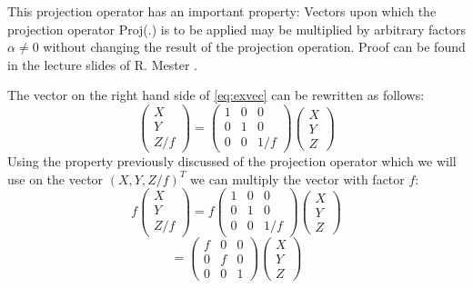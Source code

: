 This projection operator has an important property: Vectors upon which the projection operator Proj(.) is to be applied may be multiplied by arbitrary factors $\alpha\neq 0$ without changing the result of the projection operation. Proof can be found in the lecture slides of R. Mester \cite{computer_vision}.\bigskip

The vector on the right hand side of \autoref{eq:exvec} can be rewritten as follows:
\begin{equation}
    \begin{pmatrix}
        X \\ Y \\ Z/f
    \end{pmatrix} = 
    \begin{pmatrix}
        1 & 0 & 0\\ 
        0 & 1 & 0\\ 
        0 & 0 & 1/f
    \end{pmatrix}
    \begin{pmatrix}
        X \\ Y \\ Z
    \end{pmatrix}
\end{equation}
Using the property previously discussed of the projection operator which we will use on the vector $(X, Y, Z/f)^T$ we can multiply the vector with factor $f$:
\begin{equation}
    f\begin{pmatrix}
        X \\ Y \\ Z/f
    \end{pmatrix} = f
    \begin{pmatrix}
        1 & 0 & 0\\ 
        0 & 1 & 0\\ 
        0 & 0 & 1/f
    \end{pmatrix}
    \begin{pmatrix}
        X \\ Y \\ Z
    \end{pmatrix}
\end{equation}
\begin{equation}
    = \begin{pmatrix}
        f & 0 & 0\\ 
        0 & f & 0\\ 
        0 & 0 & 1
    \end{pmatrix}
    \begin{pmatrix}
        X \\ Y \\ Z
    \end{pmatrix}   
\end{equation} 
